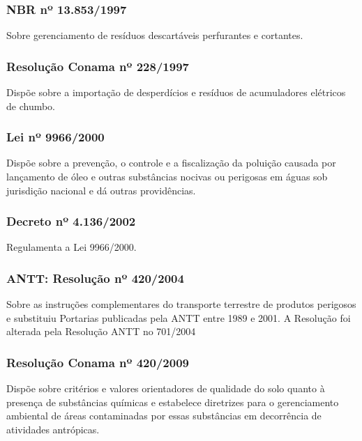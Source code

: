 \begin{subapend}
\begin{subsubapend}
		\subsubsection{NBR nº 13.853/1997}
		Sobre gerenciamento de resíduos descartáveis perfurantes e cortantes.
		
		\subsubsection{Resolução Conama nº 228/1997}
		Dispõe sobre a importação de desperdícios e resíduos de acumuladores elétricos de chumbo.
		
		\subsubsection{Lei nº 9966/2000}
		Dispõe sobre a prevenção, o controle e a fiscalização da poluição causada por lançamento de óleo e outras substâncias nocivas ou perigosas em águas sob jurisdição nacional e dá outras providências.
		
		\subsubsection{Decreto nº 4.136/2002}
		Regulamenta a Lei 9966/2000.
	
		
		\subsubsection{ANTT: Resolução nº 420/2004}
		Sobre as instruções complementares do transporte terrestre de produtos perigosos e substituiu Portarias publicadas pela ANTT entre 1989 e 2001. A Resolução foi alterada pela Resolução ANTT no 701/2004
		
		\subsubsection{Resolução Conama nº 420/2009}
		Dispõe sobre critérios e valores orientadores de qualidade do solo quanto à presença de substâncias químicas e estabelece diretrizes para o gerenciamento ambiental de áreas contaminadas por essas substâncias em decorrência de atividades antrópicas.
	

\end{subsubapend}
\end{subapend}
